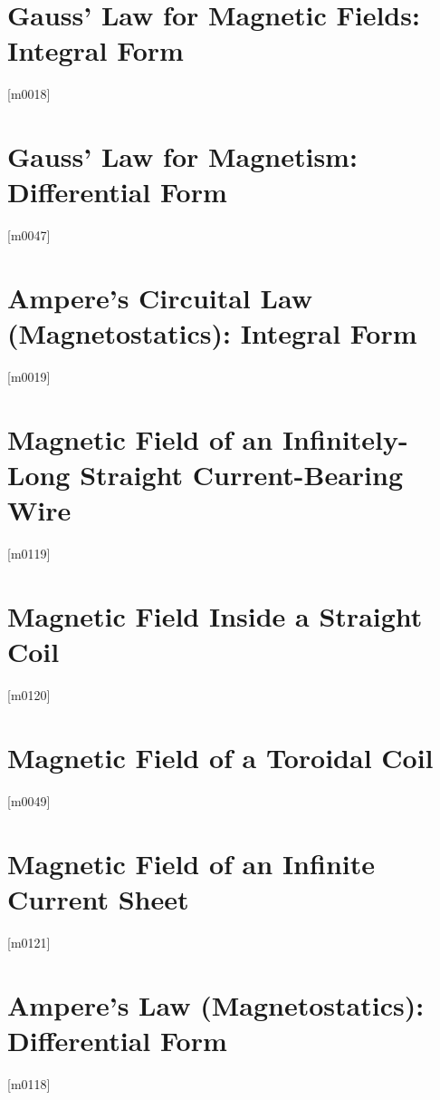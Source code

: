 \documentclass[10pt,letterpaper,twocolumn,openany]{book}
\theoremstyle{definition} %
\begin{document}
    \section{Gauss' Law for Magnetic Fields: Integral Form}
{\color{blue}\tiny[m0018]}      
      \vfill\break
    \section{Gauss' Law for Magnetism: Differential Form}
{\color{blue}\tiny[m0047]}      
      \vfill\break
    \section{Ampere's Circuital Law (Magnetostatics): Integral Form}
{\color{blue}\tiny[m0019]}      
      \vfill\break
    \section{Magnetic Field of an Infinitely-Long Straight Current-Bearing Wire}
{\color{blue}\tiny[m0119]}      
      \vfill\break
    \section{Magnetic Field Inside a Straight Coil}
{\color{blue}\tiny[m0120]}      
      \vfill\break
    \section{Magnetic Field of a Toroidal Coil}
{\color{blue}\tiny[m0049]}      
      \vfill\break
    \section{Magnetic Field of an Infinite Current Sheet}
{\color{blue}\tiny[m0121]}      
      \vfill\break
    \section{Ampere's Law (Magnetostatics): Differential Form}
{\color{blue}\tiny[m0118]}      
      \vfill\break
\end{document}

